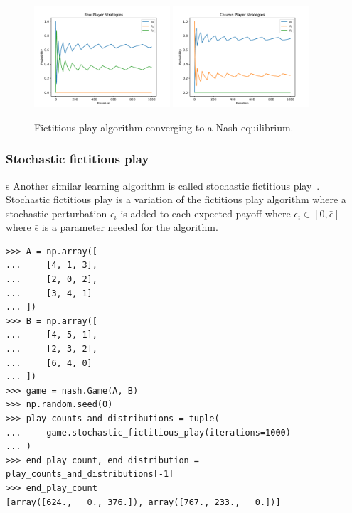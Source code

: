 \begin{figure}[H]
    \centering
    \includegraphics[width=0.45\textwidth]{chapters/04_game_theoretic_model/img/learning_algorithms_example/fictitious_row.pdf}
    \includegraphics[width=0.45\textwidth]{chapters/04_game_theoretic_model/img/learning_algorithms_example/fictitious_col.pdf}
    \caption{Fictitious play algorithm converging to a Nash equilibrium.}
    \label{fig:fictitious_play}
\end{figure}


\subsubsection{Stochastic fictitious play}s
Another similar learning algorithm is called stochastic fictitious
play~\cite{hofbauerstochasticfictitous, fudenberg1998theory}.
Stochastic fictitious play is a variation of the fictitious play algorithm
where a stochastic perturbation \(\epsilon_i\) is added to each expected payoff
where \(\epsilon_i \in [0, \bar{\epsilon}]\) where \(\bar{\epsilon}\) is a
parameter needed for the algorithm.


\begin{lstlisting}[style=pystyle]
>>> A = np.array([
...     [4, 1, 3],
...     [2, 0, 2],
...     [3, 4, 1]
... ])
>>> B = np.array([
...     [4, 5, 1],
...     [2, 3, 2],
...     [6, 4, 0]
... ])
>>> game = nash.Game(A, B)
>>> np.random.seed(0)
>>> play_counts_and_distributions = tuple(
...     game.stochastic_fictitious_play(iterations=1000)
... )
>>> end_play_count, end_distribution = play_counts_and_distributions[-1]
>>> end_play_count
[array([624.,   0., 376.]), array([767., 233.,   0.])]

\end{lstlisting}

